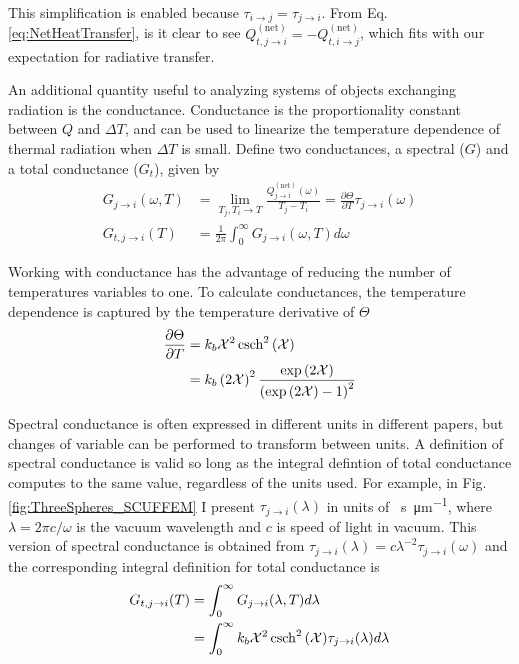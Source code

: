 This simplification is enabled because $\tau_{i \rightarrow j} = \tau_{j \rightarrow i}$.\cite{Narayanaswamy2013a} From Eq. \ref{eq:NetHeatTransfer}, is it clear to see $Q_{t,j \rightarrow i}^{(\mathrm{net})} = - Q_{t,i \rightarrow j}^{(\mathrm{net})}$, which fits with our expectation for radiative transfer.

An additional quantity useful to analyzing systems of objects exchanging radiation is the conductance. Conductance is the proportionality constant between $Q$ and $\Delta T$, and can be used to linearize the temperature dependence of thermal radiation when $\Delta T$ is small. Define two conductances, a spectral ($G$) and a total conductance ($G_{t}$), given by
%
\begin{align}
G_{j \rightarrow i}(\omega, T) &= \lim_{T_{j},T_{i} \rightarrow T} \frac{Q_{j \rightarrow i}^{\mathrm{(net)}}(\omega)}{T_{j}-T_{i}} =  \frac{\partial \Theta}{\partial T} \tau_{j \rightarrow i} \left( \omega \right)
\\
G_{t, j \rightarrow i}(T) &= \frac{1}{2\pi} \int_{0}^{\infty} G_{j \rightarrow i}(\omega, T) d\omega
\end{align}

Working with conductance has the advantage of reducing the number of temperatures variables to one. To calculate conductances, the temperature dependence is captured by the temperature derivative of $\Theta$
%
\begin{equation} \label{eq:TemperatureDerivative}
\begin{split}
\frac{\partial \Theta}{\partial T} &= k_{b} \mathcal{X}^{2} \operatorname{csch}^{2}{\left( \mathcal{X} \right)}
\\
&= k_{b} \left( 2 \mathcal{X} \right)^{2} \frac{ \exp{\left( 2 \mathcal{X} \right)} }{ \left( \exp{\left( 2 \mathcal{X} \right)} - 1 \right)^{2} }
\end{split}
\end{equation}

Spectral conductance is often expressed in different units in different papers, but changes of variable can be performed to transform between units. A definition of spectral conductance is valid so long as the integral defintion of total conductance computes to the same value, regardless of the units used. For example, in Fig. \ref{fig:ThreeSpheres_SCUFFEM} I present $\tau_{j \rightarrow i}(\lambda)$ in units of \si{\per\second \per\micro\meter}, where $\lambda = 2 \pi c / \omega$ is the vacuum wavelength and $c$ is speed of light in vacuum. This version of spectral conductance is obtained from $\tau_{j \rightarrow i}(\lambda) = c \lambda^{-2} \tau_{j \rightarrow i}(\omega)$ and the corresponding integral definition for total conductance is
%
\begin{equation} \label{eq:TotalConductance_wavelength}
\begin{split}
G_{t,j \rightarrow i}(T) &= \int_{0}^{\infty} G_{j \rightarrow i}(\lambda, T) d\lambda
\\
&= \int_{0}^{\infty} k_{b} \mathcal{X}^{2} \operatorname{csch}^{2}{\left( \mathcal{X} \right)} \tau_{j \rightarrow i}(\lambda) d\lambda 
\end{split}
\end{equation}



